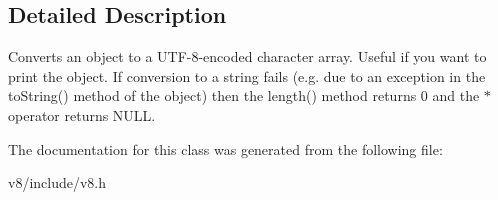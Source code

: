 \subsection{Detailed Description}
Converts an object to a U\+T\+F-\/8-\/encoded character array. Useful if you want to print the object. If conversion to a string fails (e.\+g. due to an exception in the to\+String() method of the object) then the length() method returns 0 and the $\ast$ operator returns N\+U\+LL. 

The documentation for this class was generated from the following file\+:\begin{DoxyCompactItemize}
\item 
v8/include/v8.\+h\end{DoxyCompactItemize}
